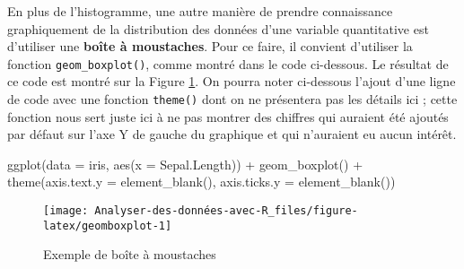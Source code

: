 \documentclass[
]{book}
\newenvironment{Shaded}{\begin{snugshade}}{\end{snugshade}}
\newcommand{\AttributeTok}[1]{\textcolor[rgb]{0.77,0.63,0.00}{#1}}
\newcommand{\FunctionTok}[1]{\textcolor[rgb]{0.00,0.00,0.00}{#1}}
\newcommand{\NormalTok}[1]{#1}
\newcommand{\SpecialCharTok}[1]{\textcolor[rgb]{0.00,0.00,0.00}{#1}}
\begin{document}
En plus de l'histogramme, une autre manière de prendre connaissance graphiquement de la distribution des données d'une variable quantitative est d'utiliser une \textbf{boîte à moustaches}. Pour ce faire, il convient d'utiliser la fonction \texttt{geom\_boxplot()}, comme montré dans le code ci-dessous. Le résultat de ce code est montré sur la Figure \ref{fig:geomboxplot}. On pourra noter ci-dessous l'ajout d'une ligne de code avec une fonction \texttt{theme()} dont on ne présentera pas les détails ici ; cette fonction nous sert juste ici à ne pas montrer des chiffres qui auraient été ajoutés par défaut sur l'axe Y de gauche du graphique et qui n'auraient eu aucun intérêt.

\begin{Shaded}
\begin{Highlighting}[]
\FunctionTok{ggplot}\NormalTok{(}\AttributeTok{data =}\NormalTok{ iris, }\FunctionTok{aes}\NormalTok{(}\AttributeTok{x =}\NormalTok{ Sepal.Length)) }\SpecialCharTok{+}
  \FunctionTok{geom\_boxplot}\NormalTok{() }\SpecialCharTok{+}
  \FunctionTok{theme}\NormalTok{(}\AttributeTok{axis.text.y =} \FunctionTok{element\_blank}\NormalTok{(),}
        \AttributeTok{axis.ticks.y =} \FunctionTok{element\_blank}\NormalTok{())}
\end{Highlighting}
\end{Shaded}

\begin{figure}

{\centering \texttt{[image: Analyser-des-données-avec-R\_files/figure-latex/geomboxplot-1]} 

}

\caption{Exemple de boîte à moustaches}\label{fig:geomboxplot}
\end{figure}
\end{document}
